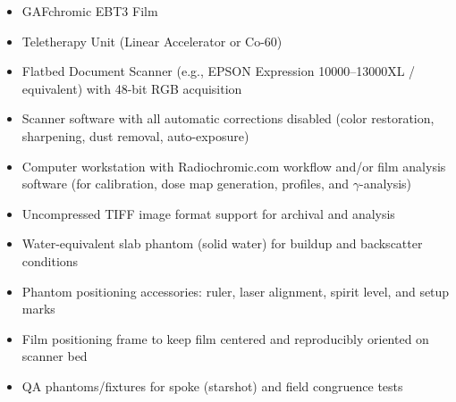 \begin{itemize}
    \item GAFchromic\texttrademark{} EBT3 Film
    \item Teletherapy Unit (Linear Accelerator or Co-60)
    \item Flatbed Document Scanner (e.g., EPSON Expression 10000--13000XL / equivalent) with 48-bit RGB acquisition
    \item Scanner software with all automatic corrections disabled (color restoration, sharpening, dust removal, auto-exposure)
    \item Computer workstation with Radiochromic.com workflow and/or film analysis software (for calibration, dose map generation, profiles, and $\gamma$-analysis)
    \item Uncompressed TIFF image format support for archival and analysis
    \item Water-equivalent slab phantom (solid water) for buildup and backscatter conditions
    \item Phantom positioning accessories: ruler, laser alignment, spirit level, and setup marks
    \item Film positioning frame to keep film centered and reproducibly oriented on scanner bed
    \item QA phantoms/fixtures for spoke (starshot) and field congruence tests
\end{itemize}